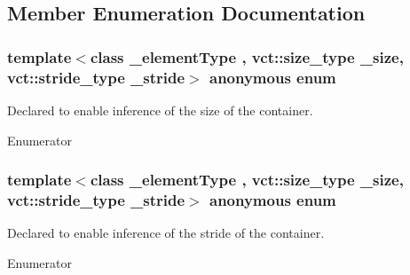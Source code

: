\subsection{Member Enumeration Documentation}
\hypertarget{classvct_fixed_size_vector_traits_a47888b1140c58261aa5df8f3440b527e}{\subsubsection[{anonymous enum}]{\setlength{\rightskip}{0pt plus 5cm}template$<$class \-\_\-element\-Type , vct\-::size\-\_\-type \-\_\-size, vct\-::stride\-\_\-type \-\_\-stride$>$ anonymous enum}}\label{classvct_fixed_size_vector_traits_a47888b1140c58261aa5df8f3440b527e}
Declared to enable inference of the size of the container. \begin{Desc}
\item[Enumerator]\par
\begin{description}
\item[{\em 
\hypertarget{classvct_fixed_size_vector_traits_a47888b1140c58261aa5df8f3440b527eac93e9bcd3ebe92f3bc7d9f34e8a47b94}{S\-I\-Z\-E}\label{classvct_fixed_size_vector_traits_a47888b1140c58261aa5df8f3440b527eac93e9bcd3ebe92f3bc7d9f34e8a47b94}
}]\end{description}
\end{Desc}
\hypertarget{classvct_fixed_size_vector_traits_ac698cfb1928dc4e54893e2cb1f658afb}{\subsubsection[{anonymous enum}]{\setlength{\rightskip}{0pt plus 5cm}template$<$class \-\_\-element\-Type , vct\-::size\-\_\-type \-\_\-size, vct\-::stride\-\_\-type \-\_\-stride$>$ anonymous enum}}\label{classvct_fixed_size_vector_traits_ac698cfb1928dc4e54893e2cb1f658afb}
Declared to enable inference of the stride of the container. \begin{Desc}
\item[Enumerator]\par
\begin{description}
\item[{\em 
\hypertarget{classvct_fixed_size_vector_traits_ac698cfb1928dc4e54893e2cb1f658afba4be4dfff5fff04a513ed92c80f0201e9}{S\-T\-R\-I\-D\-E}\label{classvct_fixed_size_vector_traits_ac698cfb1928dc4e54893e2cb1f658afba4be4dfff5fff04a513ed92c80f0201e9}
}]\end{description}
\end{Desc}


